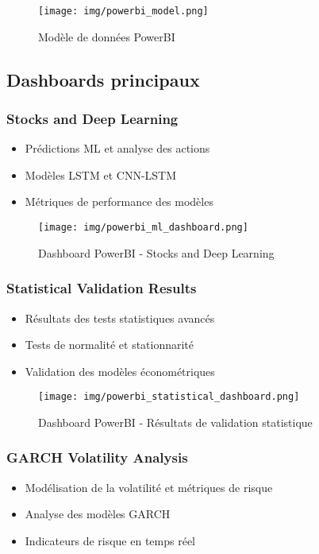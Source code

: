 \begin{figure}[H]
    \centering
    \texttt{[image: img/powerbi\_model.png]}
    \caption{Modèle de données PowerBI}
    \label{fig:powerbi_model}
\end{figure}

\subsection{Dashboards principaux}
\subsubsection{Stocks and Deep Learning}
\begin{itemize}
    \item Prédictions ML et analyse des actions
    \item Modèles LSTM et CNN-LSTM
    \item Métriques de performance des modèles
\end{itemize}

\begin{figure}[H]
    \centering
    \texttt{[image: img/powerbi\_ml\_dashboard.png]}
    \caption{Dashboard PowerBI - Stocks and Deep Learning}
    \label{fig:powerbi_ml_dashboard}
\end{figure}

\subsubsection{Statistical Validation Results}
\begin{itemize}
    \item Résultats des tests statistiques avancés
    \item Tests de normalité et stationnarité
    \item Validation des modèles économétriques
\end{itemize}

\begin{figure}[H]
    \centering
    \texttt{[image: img/powerbi\_statistical\_dashboard.png]}
    \caption{Dashboard PowerBI - Résultats de validation statistique}
    \label{fig:powerbi_statistical_dashboard}
\end{figure}

\subsubsection{GARCH Volatility Analysis}
\begin{itemize}
    \item Modélisation de la volatilité et métriques de risque
    \item Analyse des modèles GARCH
    \item Indicateurs de risque en temps réel
\end{itemize}

